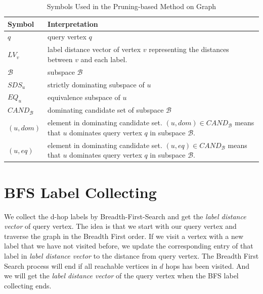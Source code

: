 \begin{table}[h]
\centering
\begin{tabular}{|l|p{11cm}|}
\hline
Symbol                      & Interpretation                                                                                                                                     \\ \hline
$q$                         & query vertex $q$                                                                                                                                   \\ \hline
$LV_v$                      & label distance vector of vertex $v$ representing the distances between $v$ and each label.                                                         \\ \hline
$\mathcal{B}$               & subspace $\mathcal{B}$                                                                                                                             \\ \hline
$\mathit{SDS}_u$            & strictly dominating subspace of $u$                                                                                                                \\ \hline
$\mathit{EQ}_u$             & equivalence subspace of $u$                                                                                                                        \\ \hline
$\mathit{CAND}_\mathcal{B}$ & dominating candidate set of subspace $\mathcal{B}$                                                                                                 \\ \hline
$(u, dom)$                  & element in dominating candidate set. $(u, dom) \in \mathit{CAND}_\mathcal{B}$ means that $u$ dominates query vertex $q$ in subspace $\mathcal{B}$. \\ \hline
$(u, eq)$                   & element in dominating candidate set. $(u, eq) \in \mathit{CAND}_\mathcal{B}$ means that $u$ dominates query vertex $q$ in subspace $\mathcal{B}$.  \\ \hline
\end{tabular}
    \caption{\label{font-table}Symbols Used in the Pruning-based Method on Graph}
    \label{tab:symbol_graph}
\end{table}

\section{BFS Label Collecting}
\label{sec:bfs-collect}
We collect the d-hop labels by Breadth-First-Search and get the \emph{label distance vector} of query vertex. The idea is that we start with our query vertex and traverse the graph in the Breadth First order. If we visit a vertex with a new label that we have not visited before, we update the corresponding entry of that label in \emph{label distance vector} to the distance from query vertex. The Breadth First Search process will end if all reachable vertices in $d$ hops has been visited. And we will get the \emph{label distance vector} of the query vertex when the BFS label collecting ends.

